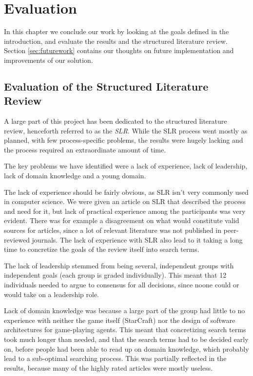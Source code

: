 
\chapter{Evaluation}
In this chapter we conclude our work by looking at the goals defined in the
introduction, and evaluate the results and the structured literature
review. Section \ref{sec:futurework} contains our thoughts on future
implementation and improvements of our solution.

\section{Evaluation of the Structured Literature Review}
A large part of this project has been dedicated to the structured literature
review, henceforth referred to as the \textit{SLR}. While the SLR process went
mostly as planned, with few process-specific problems, the results were hugely
lacking and the process required an extraordinate amount of time.

The key problems we have identified were a lack of experience, lack of
leadership, lack of domain knowledge and a young domain.

The lack of experience should be fairly obvious, as SLR isn't very commonly
used in computer science. We were given an article on SLR that described the
process and need for it, but lack of practical experience among the
participants was very evident. There was for example a disagreement on what
would constitute valid sources for articles, since a lot of relevant literature
was not published in peer-reviewed journals. The lack of
experience with SLR also lead to it taking a long time to concretize the goals
of the review itself into search terms.

The lack of leadership stemmed from being several, independent groups with
independent goals (each group is graded individually). This meant that 12
individuals needed to argue to consensus for all decisions, since noone could
or would take on a leadership role.

Lack of domain knowledge was because a large part of the group had little to no
experience with neither the game itself (StarCraft) nor the design of software
architectures for game-playing agents. This meant that concretizing search
terms took much longer than needed, and that the search terms had to be
decided early on, before people had been able to read up on domain knowledge,
which probably lead to a sub-optimal searching process. This was partially
reflected in the results, because many of the highly rated articles were mostly
useless.

